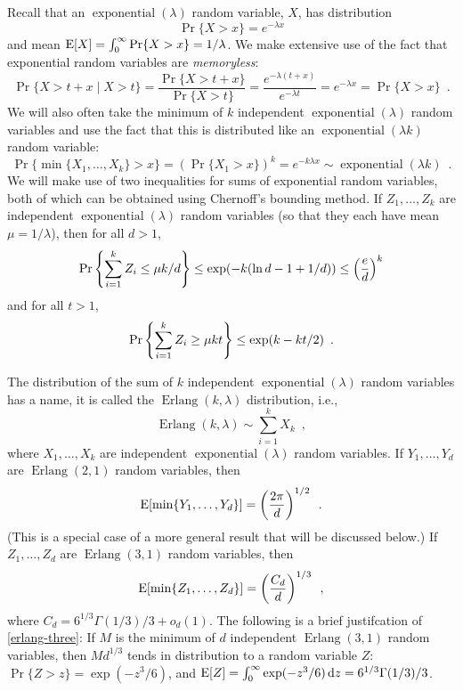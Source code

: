 \documentclass[lotsofwhite]{patmorin}
\DeclareMathOperator{\exponential}{exponential}
\DeclareMathOperator{\erlang}{Erlang}
\begin{document}
Recall that an $\exponential(\lambda)$ random variable, $X$, has
distribution 
\[
   \Pr\{X>x\} = e^{-\lambda x} 
\]
and mean $\mathrm{E}[X] = \int_0^{\infty} \Pr\{X>x\} = 1/\lambda$.  
We make extensive use of the fact that exponential random variables are
\emph{memoryless}:
\[
    \Pr\{X > t+x\mid X>t\} = \frac{\Pr\{X> t+x\}}{\Pr\{X > t\}}
           = \frac{e^{-\lambda(t+x)}}{e^{-\lambda t}} = e^{-\lambda x} = \Pr\{X > x\} \enspace .
\]
We will also often take the minimum of $k$ independent $\exponential(\lambda)$ random variables and use the fact that this is distributed like an
$\exponential(\lambda k)$ random variable:
\[
   \Pr\{\min\{X_1,\ldots,X_k\} > x\} 
      = (\Pr\{X_1 > x\})^{k}
      = e^{-k\lambda x} \sim \exponential(\lambda k) \enspace .
\]
We will make use of two inequalities for sums of exponential random
variables, both of which can be obtained using Chernoff's bounding
method.  If $Z_1,\ldots,Z_k$ are independent $\exponential(\lambda)$
random variables (so that they each have mean $\mu=1/\lambda$), then
for all $d>1$,
\begin{equation}
    \Pr\left\{\sum_{i=1}^k Z_i \le \mu k/d\right\} \le \exp(-k(\ln d -1 + 1/d)) \le \left(\frac{e}{d}\right)^k  \eqlabel{head-bound}
\end{equation}
and for all $t>1$, 
\begin{equation}
    \Pr\left\{\sum_{i=1}^k Z_i \ge \mu k t\right\} \le \exp (k-kt/2) \enspace . \eqlabel{tail-bound}
\end{equation}

The distribution of the sum of $k$ independent $\exponential(\lambda)$
random variables has a name, it is called the $\erlang(k,\lambda)$
distribution, i.e.,
\[
    \erlang(k,\lambda) \sim \sum_{i=1}^k X_k \enspace ,
\]
where $X_1,\ldots,X_k$ are independent $\exponential(\lambda)$ random variables.
If $Y_1,\ldots,Y_d$ are $\erlang(2,1)$ random variables, then
\begin{equation}
    \E[\min\{Y_1,\ldots,Y_d\}] = \left(\frac{2\pi}{d}\right)^{1/2}  \enspace . \eqlabel{erlang-two}
\end{equation}
(This is a special case of a more general result that will be discussed below.)
If $Z_1,\ldots,Z_d$ are $\erlang(3,1)$ random variables, then
\begin{equation}
    \E[\min\{Z_1,\ldots,Z_d\}] = \left(\frac{C_d}{d}\right)^{1/3}  \eqlabel{erlang-three} \enspace ,
\end{equation}
where $C_d =  6^{1/3}\Gamma (1/3) / 3 + o_d(1)$.  The following is a brief justifcation of \eqref{erlang-three}: If $M$ is the minimum of $d$ independent $\erlang(3,1)$ random 
variables, then $Md^{1/3}$ tends in distribution to a random variable 
$Z$: $\Pr\{Z>z\} = \exp(-z^3/6)$, and $\mathrm{E}[Z]= \int_0^\infty \exp(-z^3/6)\,
\mathrm{d}z = 6^{1/3}\Gamma (1/3) / 3$. 
\end{document}
